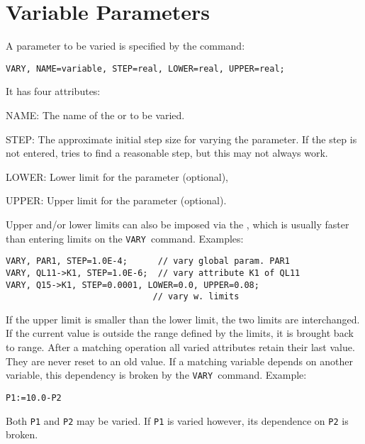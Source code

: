 \section{Variable Parameters}
\label{sec:vary}
A parameter to be varied is specified by the command:
\begin{verbatim}
VARY, NAME=variable, STEP=real, LOWER=real, UPPER=real;
\end{verbatim}
It has four attributes:
\begin{description}
\item{NAME:}
  The name of the  or
   to be varied.
\item{STEP:}
  The approximate initial step size for varying the parameter.
  If the step is not entered, \opal tries to find a reasonable step,
  but this may not always work.
\item{LOWER:}
  Lower limit for the parameter (optional),
\item{UPPER:}
  Upper limit for the parameter (optional).
\end{description}
Upper and/or lower limits can also be imposed via the
,
which is usually faster than entering limits on the
\texttt{VARY}~command. 
Examples:
\begin{verbatim}
VARY, PAR1, STEP=1.0E-4;      // vary global param. PAR1 
VARY, QL11->K1, STEP=1.0E-6;  // vary attribute K1 of QL11 
VARY, Q15->K1, STEP=0.0001, LOWER=0.0, UPPER=0.08;
                             // vary w. limits
\end{verbatim}
If the upper limit is smaller than the lower limit,
the two limits are interchanged.
If the current value is outside the range defined by the limits,
it is brought back to range.
After a matching operation all varied attributes retain their last value.
They are never reset to an old value.
If a matching variable depends on another variable,
this dependency is broken by the \texttt{VARY}~command.
Example:
\begin{verbatim}
P1:=10.0-P2
\end{verbatim}
Both \texttt{P1} and \texttt{P2} may be varied.
If \texttt{P1} is varied however, its dependence on \texttt{P2} is broken.

 
